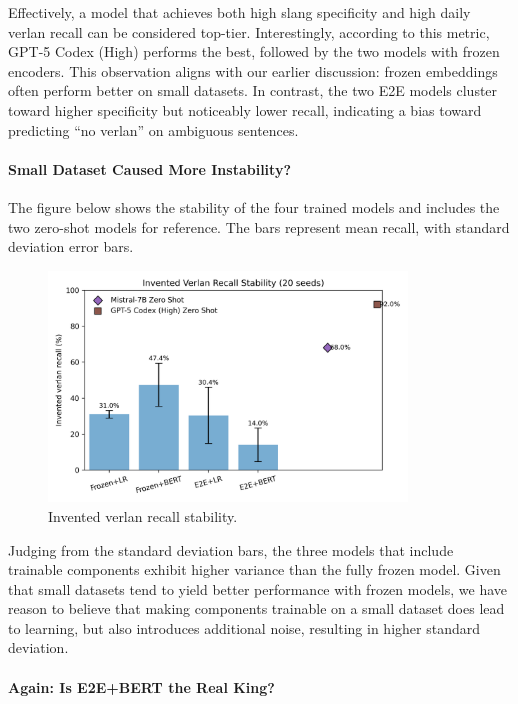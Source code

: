 \documentclass[12pt]{article}
\begin{document}
Effectively, a model that achieves both high slang specificity and high daily verlan recall can be considered top-tier. 
Interestingly, according to this metric, GPT-5 Codex (High) performs the best, followed by the two models with frozen encoders. 
This observation aligns with our earlier discussion: frozen embeddings often perform better on small datasets. 
In contrast, the two E2E models cluster toward higher specificity but noticeably lower recall, indicating a bias toward predicting ``no verlan'' on ambiguous sentences.

\paragraph{Small Dataset Caused More Instability?}

The figure below shows the stability of the four trained models and includes the two zero-shot models for reference. 
The bars represent mean recall, with standard deviation error bars.

\begin{figure}[H]
    \centering
    \includegraphics[width=0.85\textwidth]{figures/invented_recall_variance.png}
    \caption{Invented verlan recall stability.}
    \label{fig:invented-variance}
\end{figure}

Judging from the standard deviation bars, the three models that include trainable components exhibit higher variance than the fully frozen model. 
Given that small datasets tend to yield better performance with frozen models, we have reason to believe that making components trainable on a small dataset does lead to learning, but also introduces additional noise, resulting in higher standard deviation.

\paragraph{Again: Is E2E+BERT the Real King?}
\end{document}
